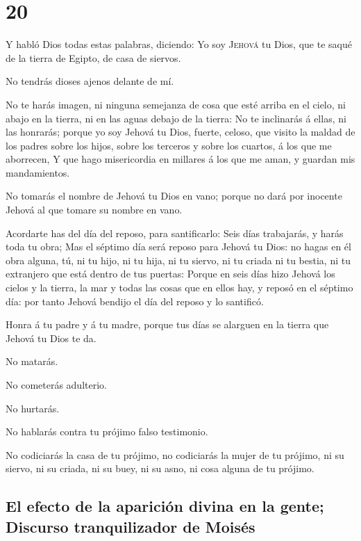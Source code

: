 \hypertarget{section-02-20}{%
\section{20}\label{section-02-20}}

 Y habló Dios todas estas palabras, diciendo:
 Yo soy \textsc{Jehová} tu Dios, que te saqué de la tierra
de Egipto, de casa de siervos.

 No tendrás dioses ajenos delante de mí.

 No te harás imagen, ni ninguna semejanza de cosa que esté
arriba en el cielo, ni abajo en la tierra, ni en las aguas debajo de la
tierra:  No te inclinarás á ellas, ni las honrarás; porque
yo soy Jehová tu Dios, fuerte, celoso, que visito la maldad de los
padres sobre los hijos, sobre los terceros y sobre los cuartos, á los
que me aborrecen,  Y que hago misericordia en millares á
los que me aman, y guardan mis mandamientos.

 No tomarás el nombre de Jehová tu Dios en vano; porque no
dará por inocente Jehová al que tomare su nombre en vano.

 Acordarte has del día del reposo, para santificarlo:
 Seis días trabajarás, y harás toda tu obra;
 Mas el séptimo día será reposo para Jehová tu Dios: no
hagas en él obra alguna, tú, ni tu hijo, ni tu hija, ni tu siervo, ni tu
criada ni tu bestia, ni tu extranjero que está dentro de tus puertas:
 Porque en seis días hizo Jehová los cielos y la tierra,
la mar y todas las cosas que en ellos hay, y reposó en el séptimo día:
por tanto Jehová bendijo el día del reposo y lo santificó.

 Honra á tu padre y á tu madre, porque tus días se
alarguen en la tierra que Jehová tu Dios te da.

 No matarás.

 No cometerás adulterio.

 No hurtarás.

 No hablarás contra tu prójimo falso testimonio.

 No codiciarás la casa de tu prójimo, no codiciarás la
mujer de tu prójimo, ni su siervo, ni su criada, ni su buey, ni su asno,
ni cosa alguna de tu prójimo.

\hypertarget{el-efecto-de-la-apariciuxf3n-divina-en-la-gente-discurso-tranquilizador-de-moisuxe9s}{%
\subsection{El efecto de la aparición divina en la gente; Discurso
tranquilizador de
Moisés}\label{el-efecto-de-la-apariciuxf3n-divina-en-la-gente-discurso-tranquilizador-de-moisuxe9s}}

